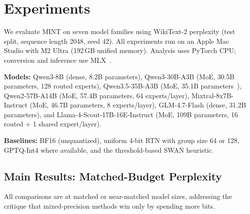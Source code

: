 \documentclass{article}
\begin{document}
\section{Experiments}
\label{sec:experiments}

We evaluate MINT on seven model families using WikiText-2 perplexity (test split, sequence length 2048, seed 42). All experiments run on an Apple Mac Studio with M2 Ultra (192\,GB unified memory). Analysis uses PyTorch CPU; conversion and inference use MLX~\cite{mlx2023}.

\textbf{Models:} Qwen3-8B (dense, 8.2B parameters), Qwen3-30B-A3B (MoE, 30.5B parameters, 128 routed experts), Qwen3.5-35B-A3B (MoE, 35.1B parameters~\cite{qwen3.5}), Qwen2-57B-A14B (MoE, 57.4B parameters, 64 experts/layer), Mixtral-8x7B-Instruct (MoE, 46.7B parameters, 8 experts/layer), GLM-4.7-Flash (dense, 31.2B parameters), and Llama-4-Scout-17B-16E-Instruct (MoE, 109B parameters, 16 routed + 1 shared expert/layer).

\textbf{Baselines:} BF16 (unquantized), uniform 4-bit RTN with group size 64 or 128, GPTQ-Int4 where available, and the threshold-based SWAN heuristic.

\subsection{Main Results: Matched-Budget Perplexity}
\label{sec:main_results}

All comparisons are at matched or near-matched model sizes, addressing the critique that mixed-precision methods win only by spending more bits.
\end{document}
